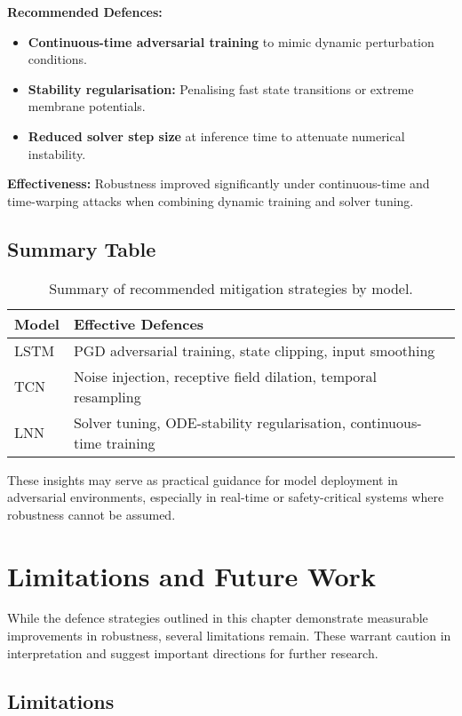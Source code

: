 \textbf{Recommended Defences:}
\begin{itemize}
    \item \textbf{Continuous-time adversarial training} to mimic dynamic perturbation conditions.
    \item \textbf{Stability regularisation:} Penalising fast state transitions or extreme membrane potentials.
    \item \textbf{Reduced solver step size} at inference time to attenuate numerical instability.
\end{itemize}

\textbf{Effectiveness:} Robustness improved significantly under continuous-time and time-warping attacks when combining dynamic training and solver tuning.

\subsection{Summary Table}

\begin{table}[H]
\centering
\begin{tabular}{|l|p{9cm}|}
\hline
\textbf{Model} & \textbf{Effective Defences} \\
\hline
LSTM & PGD adversarial training, state clipping, input smoothing \\
TCN & Noise injection, receptive field dilation, temporal resampling \\
LNN & Solver tuning, ODE-stability regularisation, continuous-time training \\
\hline
\end{tabular}
\caption{Summary of recommended mitigation strategies by model.}
\label{tab:model_defences}
\end{table}

These insights may serve as practical guidance for model deployment in adversarial environments, especially in real-time or safety-critical systems where robustness cannot be assumed.

\section{Limitations and Future Work}

While the defence strategies outlined in this chapter demonstrate measurable improvements in robustness, several limitations remain. These warrant caution in interpretation and suggest important directions for further research.

\subsection{Limitations}

